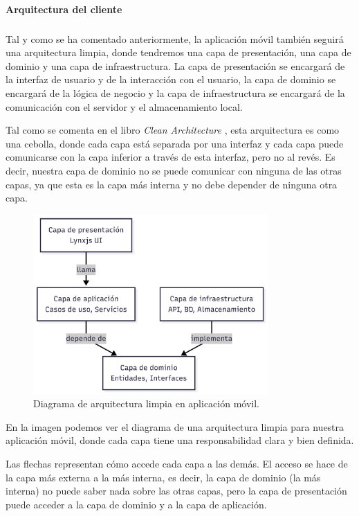 \paragraph{Arquitectura del cliente}
\subparagraph{}
Tal y como se ha comentado anteriormente, la aplicación móvil también seguirá una arquitectura limpia, donde tendremos una capa de presentación, una capa de dominio y una capa de infraestructura.
La capa de presentación se encargará de la interfaz de usuario y de la interacción con el usuario, la capa de dominio se encargará de la lógica de negocio y la capa de infraestructura se encargará de la comunicación con el servidor y el almacenamiento local.

Tal como se comenta en el libro \textit{Clean Architecture} \parencite{uncle-bob-clean-architecture}, esta arquitectura es como una cebolla, donde cada capa está separada por una interfaz y cada capa puede comunicarse con la capa inferior a través de esta interfaz, pero no al revés.
Es decir, nuestra capa de dominio no se puede comunicar con ninguna de las otras capas, ya que esta es la capa más interna y no debe depender de ninguna otra capa.


\begin{figure}[H]
  \centering
  \includegraphics[width=0.8\textwidth]{assets/clean-architecture-mobile.png}
  \caption{Diagrama de arquitectura limpia en aplicación móvil.}
  \label{fig:clean-architecture-mobile}
\end{figure}

En la imagen podemos ver el diagrama de una arquitectura limpia para nuestra aplicación móvil, donde cada capa tiene una responsabilidad clara y bien definida.

Las flechas representan cómo accede cada capa a las demás.
El acceso se hace de la capa más externa a la más interna, es decir, la capa de dominio (la más interna) no puede saber nada sobre las otras capas, pero la capa de presentación puede acceder a la capa de dominio y a la capa de aplicación. 

